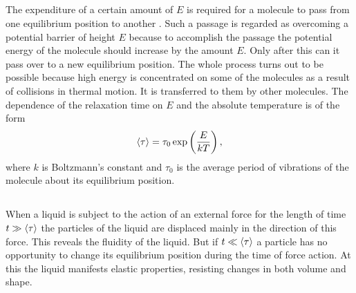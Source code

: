 \subsection{}\label{13.2.5} The expenditure of a certain amount of  $E$ is required for a molecule to pass from one equilibrium posi­tion to another . Such a passage is regarded as overcoming a potential barrier of height $E$  because to accom­plish the passage the potential energy of the molecule should increase by the amount $E$. Only after this can it pass over to a new equilibrium position. The whole process turns out to be possible because high energy is concentrated on some of the molecules as a result of collisions in thermal motion. It is transferred to them by other molecules. The dependence of the relaxation time  on $E$ and the absolute temperature is of the form
\begin{equation*}%
\expval{\tau}  = \tau_{0} \exp \left( \frac{E}{kT} \right),
\end{equation*}
where $k$ is Boltzmann's constant  and $\tau_{0}$ is the average period of vibrations of the molecule about its equilibrium position.

\subsection{}\label{13.2.6} When a liquid is subject to the action of an external force for the length of time $t \gg \expval{\tau}$ the particles of the liquid are displaced mainly in the direction of this force. This reveals the fluidity of the liquid. But if $t \ll \expval{\tau}$ a particle has no opportunity to change its equilibrium position during the time of
force action. At this the liquid manifests elastic properties, resisting changes in both volume and shape.

